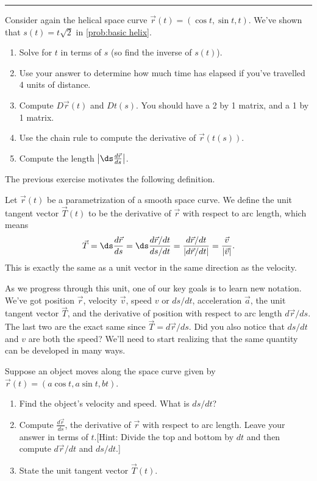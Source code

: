 \hrule


\begin{problem}
%
Consider again the helical space curve $\vec r(t)=(\cos t, \sin t, t)$.  We've shown that $s(t) = t\sqrt{2}$ in \ref{prob:basic helix}. 
\begin{enumerate}
	\item Solve for $t$ in terms of $s$ (so find the inverse of $s(t)$). 
	\item Use your answer to determine how much time has elapsed if you've travelled 4 units of distance.
	\item Compute $D\vec r(t)$ and $Dt(s)$.  You should have a 2 by 1 matrix, and a 1 by 1 matrix. 
	\item Use the chain rule to compute the derivative of $\vec r(t(s))$.
	\item Compute the length $\left|\ds\frac{d\vec r}{ds}\right|$.
\end{enumerate}
\end{problem}

The previous exercise motivates the following definition.

\begin{definition}\label{def:unit tangent vector}
 Let $\vec r(t)$ be a parametrization of a smooth space curve. We define the unit tangent vector $\vec T(t)$ to be the derivative of $\vec r$ with respect to arc length, which means
$$\vec T = \ds\frac{d\vec r}{ds}=\ds\frac{d\vec r/dt}{ds/dt} = \frac{d\vec r/dt}{|d \vec r/dt|} = \frac{\vec v}{|\vec v|}.$$
This is exactly the same as a unit vector in the same direction as the velocity.
\end{definition}

As we progress through this unit, one of our key goals is to learn new notation.  We've got position $\vec r$,  velocity $\vec v$, speed $v$ or $ds/dt$, acceleration $\vec a$, the unit tangent vector $\vec T$, and the derivative of position with respect to arc length $d\vec r/ds$.  The last two are the exact same since $\vec T = d\vec r/ds$. Did you also notice that $ds/dt$ and $v$ are both the speed?  We'll need to start realizing that the same quantity can be developed in many ways. 

\begin{problem}
%
 Suppose an object moves along the space curve given by  $\vec r(t)=(a\cos t,a\sin t,b t)$. 
\begin{enumerate}
 \item Find the object's velocity and speed. What is $ds/dt$?
 \item Compute $\frac{d\vec r}{ds}$, the derivative of $\vec r$ with respect to arc length. Leave your answer in terms of $t$.[Hint: Divide the top and bottom by $dt$ and then compute $d\vec r/dt$ and $ds/dt$.]  
 \item State the unit tangent vector $\vec T(t)$.
\end{enumerate}
\end{problem}

